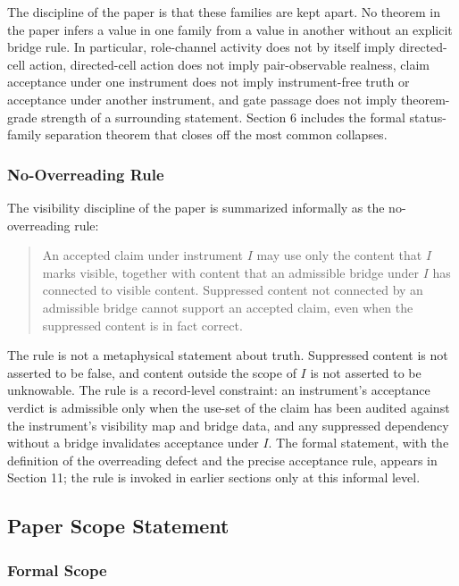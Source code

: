\documentclass[11pt]{article}
\theoremstyle{definition}
\begin{document}
The discipline of the paper is that these families are kept apart. No theorem in the paper infers a value in one family from a value in another without an explicit bridge rule. In particular, role-channel activity does not by itself imply directed-cell action, directed-cell action does not imply pair-observable realness, claim acceptance under one instrument does not imply instrument-free truth or acceptance under another instrument, and gate passage does not imply theorem-grade strength of a surrounding statement. Section 6 includes the formal status-family separation theorem that closes off the most common collapses.

\subsubsection{No-Overreading Rule}

The visibility discipline of the paper is summarized informally as the no-overreading rule:

\begin{quote}
An accepted claim under instrument \(I\) may use only the content that \(I\) marks visible, together with content that an admissible bridge under \(I\) has connected to visible content. Suppressed content not connected by an admissible bridge cannot support an accepted claim, even when the suppressed content is in fact correct.
\end{quote}

The rule is not a metaphysical statement about truth. Suppressed content is not asserted to be false, and content outside the scope of \(I\) is not asserted to be unknowable. The rule is a record-level constraint: an instrument's acceptance verdict is admissible only when the use-set of the claim has been audited against the instrument's visibility map and bridge data, and any suppressed dependency without a bridge invalidates acceptance under \(I\). The formal statement, with the definition of the overreading defect and the precise acceptance rule, appears in Section 11; the rule is invoked in earlier sections only at this informal level.

\subsection{Paper Scope Statement}

\subsubsection{Formal Scope}
\end{document}
